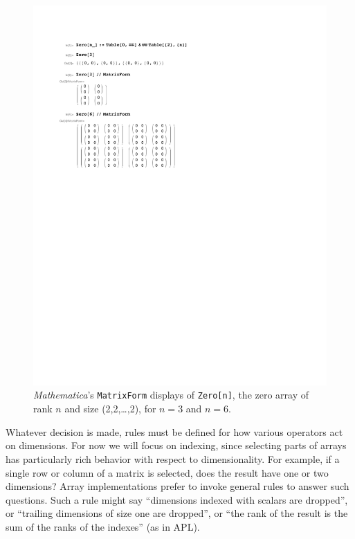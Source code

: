 \documentclass[preprint]{sigplanconf}
\newcommand{\Mathematica}{\textit{Mathematica}}
\newcommand{\code}[1]{\texttt{#1}}
\begin{document}
\begin{figure}
  \centering
  \includegraphics[width=\columnwidth]{fig-mathematica/fig.pdf}
  \caption
   {\label{fig:mathematica} \Mathematica's \code{MatrixForm} displays of \code{Zero[n]}, the zero array of rank $n$ and size (2,2,\dots,2), for $n=3$ and $n=6$.}
\end{figure}


Whatever decision is made, rules must be defined for how various operators
act on dimensions. For now we will focus on indexing, since selecting
parts of arrays has particularly rich behavior with respect to
dimensionality. For example, if a single row or column of a matrix is
selected, does the result have one or two dimensions? Array implementations
prefer to invoke general rules to answer such questions. Such a rule might
say ``dimensions indexed with scalars are dropped'', or ``trailing
dimensions of size one are dropped'', or ``the rank of the result
is the sum of the ranks of the indexes'' (as in APL).
\end{document}
